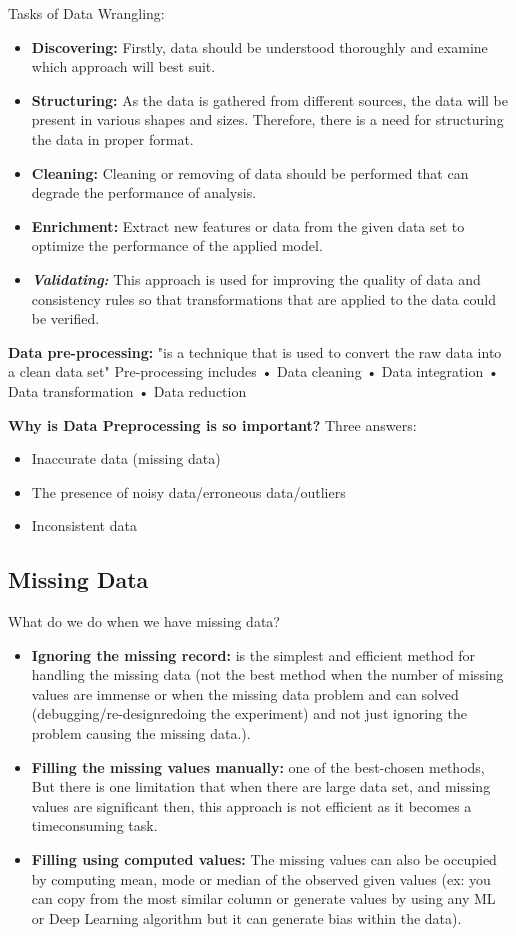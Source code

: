 \noindent Tasks of Data Wrangling:
\begin{itemize}
    \item \textbf{Discovering:} Firstly, data should be understood thoroughly and examine which approach will best suit. 
    \item \textbf{Structuring:} As the data is gathered from different sources, the data will be present in various shapes and sizes. Therefore, there is a need for structuring the data in proper format.
    \item \textbf{Cleaning:} Cleaning or removing of data should be performed that can degrade the performance of analysis.
    \item \textbf{Enrichment:} Extract new features or data from the given data set to optimize the performance of the applied model.
    \item \textbf{\textit{Validating:}} This approach is used for improving the quality of data and consistency rules so that transformations that are applied to the data could be verified.
\end{itemize}

\noindent \textbf{Data pre-processing:} "is a technique that is used to convert the raw data into a clean data set"
\noindent Pre-processing includes • Data cleaning • Data integration • Data transformation • Data reduction

\noindent \textbf{Why is Data Preprocessing is so important?}
\noindent Three answers:
\begin{itemize}
    \item Inaccurate data (missing data) 
    \item The presence of noisy data/erroneous data/outliers
    \item Inconsistent data 
\end{itemize}

\subsection{Missing Data}
\noindent What do we do when we have missing data? 
\begin{itemize}
    \item \textbf{Ignoring the missing record:} is the simplest and efficient method for handling the missing data (not the best method when the number of missing values are immense or  when the missing data problem and can solved (debugging/re-designredoing the experiment) and not just ignoring the problem causing the missing data.). 
    \item \textbf{Filling the missing values manually:} one of the best-chosen methods, But there is one limitation that when there are large data set, and missing values are significant then, this approach is not efficient as it becomes a timeconsuming task.
    \item \textbf{Filling using computed values:} The missing values can also be occupied by computing mean, mode or median of the observed given values (ex: you can copy from the most similar column or generate values by using any ML or Deep Learning algorithm but  it can generate bias within the data). 
\end{itemize}

